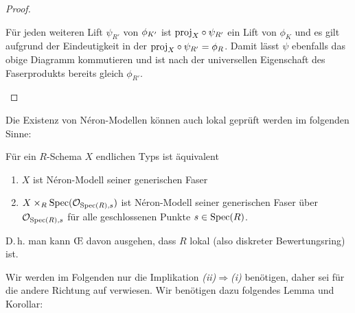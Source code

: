 \documentclass[german]{scrreprt}
\begin{document}
\begin{Satz}
\begin{proof}
\begin{enumerate}[label=(\roman*)]
\begin{description}
        Für jeden weiteren Lift $\psi_{R'}$ von $\phi_{K'}$ ist
        $\text{proj}_{X}\circ\psi_{R'}$ ein Lift von $\phi_{K}$ und es gilt
        aufgrund der Eindeutigkeit in der \NAbbEig
        $\text{proj}_{X}\circ\psi_{R'}=\phi_{R}$.
        Damit lässt $\psi$ ebenfalls das obige Diagramm kommutieren
        und ist nach der universellen Eigenschaft des Faserprodukts
        bereits gleich $\phi_{R'}$.
      \end{description}
    \end{enumerate}
  \end{proof}
\end{Satz}

Die Existenz von Néron-Modellen können auch lokal geprüft werden im
folgenden Sinne:
\begin{Satz}\label{thm:neronmodelllokal}
  \cite[1.2, Proposition 4]{neron}
  Für ein $R$-Schema $X$ endlichen Typs ist äquivalent
  \begin{enumerate}[label=(\roman*)]
  \item $X$ ist Néron-Modell seiner generischen Faser
  \item $X\times_R\operatorname{Spec}(\mathcal{O}_{\operatorname{Spec}(R),s})$ ist Néron-Modell
    seiner generischen Faser über $\mathcal{O}_{\operatorname{Spec}(R),s}$ für alle
    geschlossenen Punkte $s\in\operatorname{Spec}(R)$.
  \end{enumerate}
  D.\,h. man kann \OE{} davon ausgehen, dass $R$ lokal (also diskreter
  Bewertungsring) ist.
\end{Satz}

Wir werden im Folgenden nur die Implikation
\emph{(ii)}$\Rightarrow$\emph{(i)} benötigen, daher sei für die
andere Richtung auf \cite[1.2, Proposition 4]{neron} verwiesen.
Wir benötigen dazu folgendes Lemma und Korollar:
\end{document}
